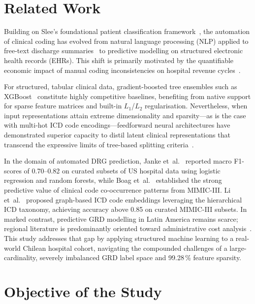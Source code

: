 \documentclass[journal]{IEEEtran}
\begin{document}
\section{Related Work}
\label{sec:related}

Building on Slee's foundational patient classification
framework~\cite{slee1978}, the automation of clinical coding
has evolved from natural language processing (NLP) applied to
free-text discharge summaries~\cite{perotte2014,baumel2018} to
predictive modelling on structured electronic health records
(EHRs).  This shift is primarily motivated by the quantifiable
economic impact of manual coding inconsistencies on hospital
revenue cycles~\cite{goldstein2017}.

For structured, tabular clinical data, gradient-boosted tree
ensembles such as XGBoost~\cite{chen2016} constitute highly
competitive baselines, benefiting from native support for sparse
feature matrices and built-in $L_1$/$L_2$ regularisation.
Nevertheless, when input representations attain extreme
dimensionality and sparsity---as is the case with multi-hot
ICD code encodings---feedforward neural architectures have
demonstrated superior capacity to distil latent clinical
representations that transcend the expressive limits of
tree-based splitting criteria~\cite{che2018}.

In the domain of automated DRG prediction, Janke
et~al.~\cite{janke2017} reported macro F1-scores of 0.70--0.82
on curated subsets of US hospital data using logistic regression
and random forests, while Boag et~al.~\cite{boag2018}
established the strong predictive value of clinical code
co-occurrence patterns from MIMIC-III.  Li et~al.~\cite{li2022}
proposed graph-based ICD code embeddings leveraging the
hierarchical ICD taxonomy, achieving accuracy above 0.85 on
curated MIMIC-III subsets.  In marked contrast, predictive GRD
modelling in Latin America remains scarce; regional literature
is predominantly oriented toward administrative cost
analysis~\cite{minsal2013}.  This study addresses that gap by
applying structured machine learning to a real-world Chilean
hospital cohort, navigating the compounded challenges of a
large-cardinality, severely imbalanced GRD label space and
99.28\,\% feature sparsity.

\section{Objective of the Study}
\label{sec:objective}
\end{document}
